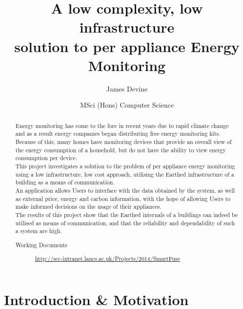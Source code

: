 \documentclass[draft,preprint,12pt,3p]{elsarticle}
\begin{document}
\vspace*{20px}
\title{A low complexity, low infrastructure\\ solution to per appliance Energy\\ Monitoring}%

\author{James Devine}
\address{School of Computing and Communications, Lancaster University}
\author{MSci (Hons) Computer Science}
\address{\today}

\begin{abstract}
Energy monitoring has come to the fore in recent years due to rapid climate change and as a result energy companies began distributing free energy monitoring kits. Because of this, many homes have monitoring devices that provide an overall view of the energy consumption of a household, but do not have the ability to view energy consumption per device.\\ 
This project investigates a solution to the problem of per appliance energy monitoring using a low infrastructure, low cost approach, utilising the Earthed infrastructure of a building as a means of communication.\\
An application allows Users to interface with the data obtained by the system, as well as external price, energy and carbon information, with the hope of allowing Users to make informed decisions on the usage of their appliances.\\
The results of this project show that the Earthed internals of a buildings can indeed be utilised as means of communication, and that the reliability and dependability of such a system are high.
\begin{description}
\item[Working Documents]
\url{http://scc-intranet.lancs.ac.uk/Projects/2014/SmartFuse}

\end{description}
\end{abstract}

\pprintMaketitle

\clearpage
\tableofcontents
\clearpage
\section{Introduction \& Motivation}
\end{document}
